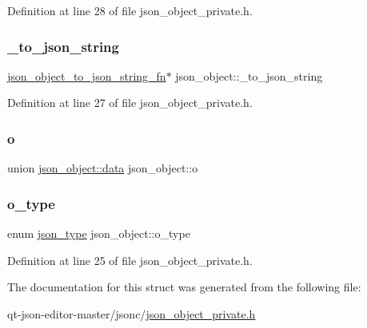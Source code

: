 Definition at line 28 of file json\+\_\+object\+\_\+private.\+h.

\mbox{\label{structjson__object_a077a02daac4653f91584dd7f47c3d632}} 
\subsubsection{\texorpdfstring{\+\_\+to\+\_\+json\+\_\+string}{\_to\_json\_string}}
{\footnotesize\ttfamily \hyperlink{json__object__private_8h_acb59d23dfb70e7662e3cde965ee2b29b}{json\+\_\+object\+\_\+to\+\_\+json\+\_\+string\+\_\+fn}$\ast$ json\+\_\+object\+::\+\_\+to\+\_\+json\+\_\+string}



Definition at line 27 of file json\+\_\+object\+\_\+private.\+h.

\mbox{\label{structjson__object_a33aff83ffea02b934235c4821cca8cf0}} 
\subsubsection{\texorpdfstring{o}{o}}
{\footnotesize\ttfamily union \hyperlink{unionjson__object_1_1data}{json\+\_\+object\+::data}  json\+\_\+object\+::o}

\mbox{\label{structjson__object_a28307a4a3fe6cefe27e28fec56b76b3e}} 
\subsubsection{\texorpdfstring{o\+\_\+type}{o\_type}}
{\footnotesize\ttfamily enum \hyperlink{json__object_8h_ac75c61993722a9b8aaa44704072ec06c}{json\+\_\+type} json\+\_\+object\+::o\+\_\+type}



Definition at line 25 of file json\+\_\+object\+\_\+private.\+h.



The documentation for this struct was generated from the following file\+:\begin{DoxyCompactItemize}
\item 
qt-\/json-\/editor-\/master/jsonc/\hyperlink{json__object__private_8h}{json\+\_\+object\+\_\+private.\+h}\end{DoxyCompactItemize}
